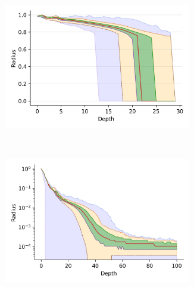 \documentclass[review,supplement,onefignum,onetabnum]{siamonline220329}
\begin{document}
\begin{figure}
\begin{subfigure}[b]{0.47\textwidth}
        \label{fig:supplement:sift-radius}
    \end{subfigure}%
    \begin{subfigure}[b]{0.47\textwidth}
        \includegraphics[width=0.9\textwidth]{images/radius/random.png}\\
        \label{fig:supplement:random-radius}
    \end{subfigure}
    \\
    \begin{subfigure}[b]{0.47\textwidth}
        \includegraphics[width=0.9\textwidth]{images/radius/silva-SSU-Ref.png}\\
        \label{fig:supplement:silva-radius}
    \end{subfigure}%
    \begin{subfigure}[b]{0.47\textwidth}

\end{subfigure}
\end{figure}
\end{document}
